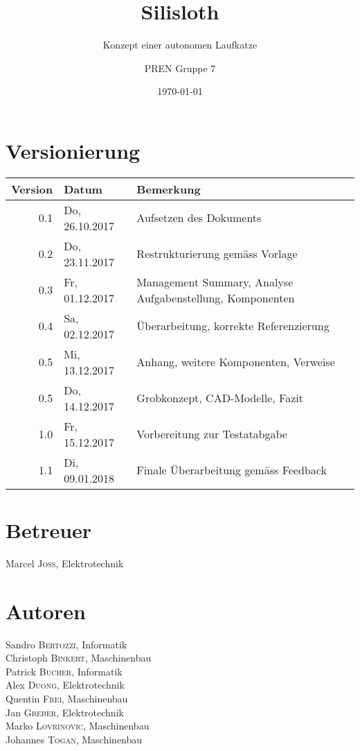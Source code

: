 \author{PREN Gruppe 7}
\title{Silisloth}
\subtitle{Konzept einer autonomen Laufkatze}
\date{\today}
\maketitle

\section*{Versionierung}
\def\arraystretch{1.2}
\begin{tabularx}{\textwidth}{|r|l|X|}
\hline
\textbf{Version} & \textbf{Datum} & \textbf{Bemerkung} \\
\hline
0.1 & Do, 26.10.2017 & Aufsetzen des Dokuments \\
0.2 & Do, 23.11.2017 & Restrukturierung gemäss Vorlage \\
0.3 & Fr, 01.12.2017 & Management Summary, Analyse Aufgabenstellung, Komponenten \\
0.4 & Sa, 02.12.2017 & Überarbeitung, korrekte Referenzierung \\
0.5 & Mi, 13.12.2017 & Anhang, weitere Komponenten, Verweise \\
0.5 & Do, 14.12.2017 & Grobkonzept, CAD-Modelle, Fazit \\
1.0 & Fr, 15.12.2017 & Vorbereitung zur Testatabgabe \\
1.1 & Di, 09.01.2018 & Finale Überarbeitung gemäss Feedback \\
\hline
\end{tabularx}
\vspace{1em}

\begin{multicols}{2}
\section*{Betreuer}
Marcel \textsc{Joss}, Elektrotechnik
\vfill\null
\columnbreak
\section*{Autoren}
Sandro \textsc{Bertozzi}, Informatik \\
Christoph \textsc{Binkert}, Maschinenbau \\
Patrick \textsc{Bucher}, Informatik \\
Alex \textsc{Duong}, Elektrotechnik \\
Quentin \textsc{Frei}, Maschinenbau \\
Jan \textsc{Greber}, Elektrotechnik \\
Marko \textsc{Lovrinovic}, Maschinenbau \\
Johannes \textsc{Togan}, Maschinenbau
\end{multicols}
